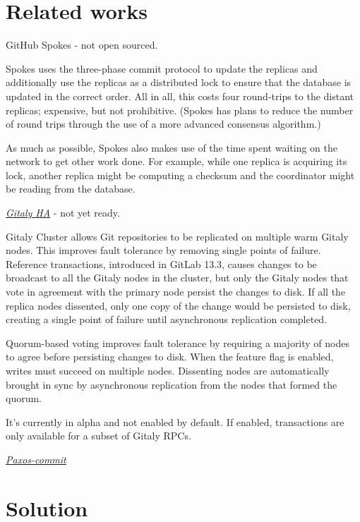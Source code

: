 \documentclass[acmlarge, screen, nonacm]{acmart}
\begin{document}
\section{Related works}

GitHub Spokes - not open sourced.

Spokes uses the three-phase commit protocol to update the replicas and additionally use the replicas as a distributed lock
to ensure that the database is updated in the correct order.
All in all, this costs four round-trips to the distant replicas;
expensive, but not prohibitive.
(Spokes has plans to reduce the number of round trips through the use of a more advanced consensus algorithm.)

As much as possible, Spokes also makes use of the time spent waiting on the network to get other work done.
For example, while one replica is acquiring its lock,
another replica might be computing a checksum and the coordinator might be reading from the database.

\emph{\href{https://gitlab.com/groups/gitlab-org/-/epics/1189}{Gitaly HA}} - not yet ready.

Gitaly Cluster allows Git repositories to be replicated on multiple warm Gitaly nodes.
This improves fault tolerance by removing single points of failure.
Reference transactions, introduced in GitLab 13.3,
causes changes to be broadcast to all the Gitaly nodes in the cluster,
but only the Gitaly nodes that vote in agreement with the primary node persist the changes to disk.
If all the replica nodes dissented, only one copy of the change would be persisted to disk,
creating a single point of failure until asynchronous replication completed.

Quorum-based voting improves fault tolerance by requiring a majority of nodes to agree before persisting changes to disk.
When the feature flag is enabled, writes must succeed on multiple nodes.
Dissenting nodes are automatically brought in sync by asynchronous replication from the nodes that formed the quorum.

It's currently in alpha and not enabled by default.
If enabled, transactions are only available for a subset of Gitaly RPCs.

\emph{\href{https://dsf.berkeley.edu/cs286/papers/paxoscommit-tods2006.pdf}{Paxos-commit}}

\section{Solution}
\end{document}

